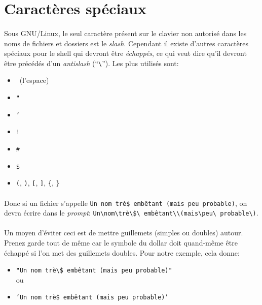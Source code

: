 \documentclass[french, a4paper, 12pt, titlepage]{article}
\begin{document}
\section{Caractères spéciaux}

\paragraph{} Sous GNU/Linux, le seul caractère présent sur le clavier non
autorisé dans les noms de fichiers et dossiers est le \emph{slash}. Cependant
il existe d'autres caractères spéciaux pour le shell qui devront être
\emph{échappés}, ce qui veut dire qu'il devront être précédés d'un
\emph{antislash} (``\texttt{\textbackslash}''). Les plus utilisés sont:

\begin{itemize}
	\item \textvisiblespace~(l'espace)
	\item \texttt{"}
	\item \texttt{'}
	\item \texttt{!}
	\item \texttt{\#}
	\item \texttt{\$}
	\item \texttt{(}, \texttt{)}, \texttt{[}, \texttt{]}, \texttt{\{}, \texttt{\}}
\end{itemize}

\paragraph{} Donc si un fichier s'appelle \texttt{Un nom trè\$ embêtant (mais
peu probable)}, on devra écrire dans le \emph{prompt}:
\texttt{Un\textbackslash{\textvisiblespace}nom\textbackslash{\textvisiblespace}trè\textbackslash\$\textbackslash\textvisiblespace
embêtant\textbackslash{\textvisiblespace}\textbackslash(mais\textbackslash{\textvisiblespace}peu\textbackslash
probable\textbackslash)}.

\paragraph{} Un moyen d'éviter ceci est de mettre guillemets (simples ou
doubles) autour. Prenez garde tout de même car le symbole du dollar doit
quand-même être échappé si l'on met des guillemets doubles. Pour notre exemple,
cela donne:
\\
\begin{itemize}
	\item \texttt{"Un nom trè\textbackslash\$ embêtant (mais peu probable)"}\\
	ou
	\item \texttt{'Un nom trè\$ embêtant (mais peu probable)'}
\end{itemize}
\end{document}
